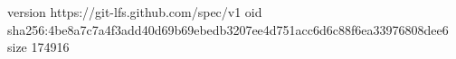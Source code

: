 version https://git-lfs.github.com/spec/v1
oid sha256:4be8a7c7a4f3add40d69b69ebedb3207ee4d751acc6d6c88f6ea33976808dee6
size 174916
